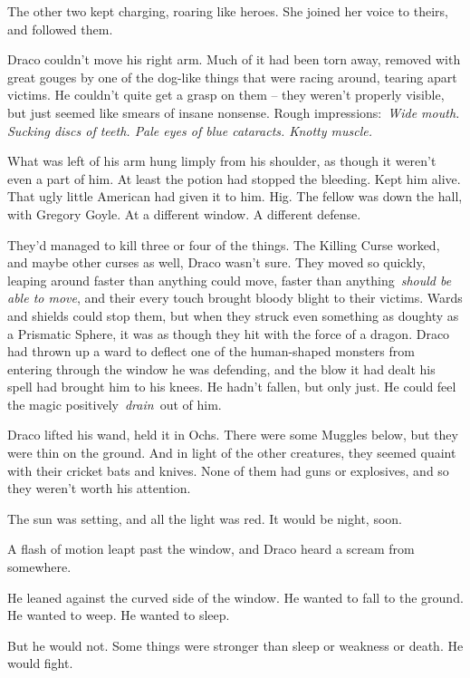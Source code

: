 The other two kept charging, roaring like heroes. She joined her voice
to theirs, and followed them.

\mybreak

Draco couldn't move his right arm. Much of it had been torn away,
removed with great gouges by one of the dog-like things that were racing
around, tearing apart victims. He couldn't quite get a grasp on them --
they weren't properly visible, but just seemed like smears of insane
nonsense. Rough impressions:~\emph{Wide mouth. Sucking discs of teeth.
Pale eyes of blue cataracts. Knotty muscle.}

What was left of his arm hung limply from his shoulder, as though it
weren't even a part of him. At least the potion had stopped the
bleeding. Kept him alive. That ugly little American had given it to him.
Hig. The fellow was down the hall, with Gregory Goyle. At a different
window. A different defense.

They'd managed to kill three or four of the things. The Killing Curse
worked, and maybe other curses as well, Draco wasn't sure. They moved so
quickly, leaping around faster than anything could move, faster than
anything~\emph{should be able to move}, and their every touch brought
bloody blight to their victims. Wards and shields could stop them, but
when they struck even something as doughty as a Prismatic Sphere, it was
as though they hit with the force of a dragon. Draco had thrown up a
ward to deflect one of the human-shaped monsters from entering through
the window he was defending, and the blow it had dealt his spell had
brought him to his knees. He hadn't fallen, but only just. He could feel
the magic positively~\emph{drain}~out of him.

Draco lifted his wand, held it in Ochs. There were some Muggles below,
but they were thin on the ground. And in light of the other creatures,
they seemed quaint with their cricket bats and knives. None of them had
guns or explosives, and so they weren't worth his attention.

The sun was setting, and all the light was red. It would be night, soon.

A flash of motion leapt past the window, and Draco heard a scream from
somewhere.

He leaned against the curved side of the window. He wanted to fall to
the ground. He wanted to weep. He wanted to sleep.

But he would not. Some things were stronger than sleep or weakness or
death. He would fight.

